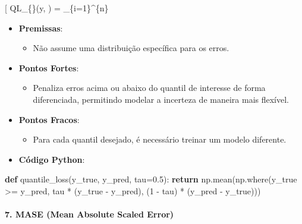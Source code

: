 \documentclass[11pt]{article}
\providecommand{\tightlist}{%
      \setlength{\itemsep}{0pt}\setlength{\parskip}{0pt}}
\newenvironment{Shaded}{}{}
\newcommand{\KeywordTok}[1]{\textcolor[rgb]{0.00,0.44,0.13}{\textbf{{#1}}}}
\newcommand{\DecValTok}[1]{\textcolor[rgb]{0.25,0.63,0.44}{{#1}}}
\newcommand{\FloatTok}[1]{\textcolor[rgb]{0.25,0.63,0.44}{{#1}}}
\newcommand{\NormalTok}[1]{{#1}}
\newcommand{\ControlFlowTok}[1]{\textcolor[rgb]{0.00,0.44,0.13}{\textbf{{#1}}}}
\newcommand{\OperatorTok}[1]{\textcolor[rgb]{0.40,0.40,0.40}{{#1}}}
\begin{document}
{[} QL\_\{\tau\}(y, ) =  \sum\_\{i=1\}\^{}\{n\}
\left[ \tau \cdot \max(y_i - \hat{y}_i, 0) + (1-\tau) \cdot \max(\hat{y}_i - y_i, 0) \right]{]}

\begin{itemize}
\tightlist
\item
  \textbf{Premissas}:

  \begin{itemize}
  \tightlist
  \item
    Não assume uma distribuição específica para os erros.
  \end{itemize}
\item
  \textbf{Pontos Fortes}:

  \begin{itemize}
  \tightlist
  \item
    Penaliza erros acima ou abaixo do quantil de interesse de forma
    diferenciada, permitindo modelar a incerteza de maneira mais
    flexível.
  \end{itemize}
\item
  \textbf{Pontos Fracos}:

  \begin{itemize}
  \tightlist
  \item
    Para cada quantil desejado, é necessário treinar um modelo
    diferente.
  \end{itemize}
\item
  \textbf{Código Python}:
\end{itemize}

\begin{Shaded}
\begin{Highlighting}[]
\KeywordTok{def}\NormalTok{ quantile\_loss(y\_true, y\_pred, tau}\OperatorTok{=}\FloatTok{0.5}\NormalTok{):}
    \ControlFlowTok{return}\NormalTok{ np.mean(np.where(y\_true }\OperatorTok{\textgreater{}=}\NormalTok{ y\_pred, tau }\OperatorTok{*}\NormalTok{ (y\_true }\OperatorTok{{-}}\NormalTok{ y\_pred), (}\DecValTok{1} \OperatorTok{{-}}\NormalTok{ tau) }\OperatorTok{*}\NormalTok{ (y\_pred }\OperatorTok{{-}}\NormalTok{ y\_true)))}
\end{Highlighting}
\end{Shaded}

\hypertarget{mase-mean-absolute-scaled-error}{%
\paragraph{7. MASE (Mean Absolute Scaled
Error)}\label{mase-mean-absolute-scaled-error}}
\end{document}
